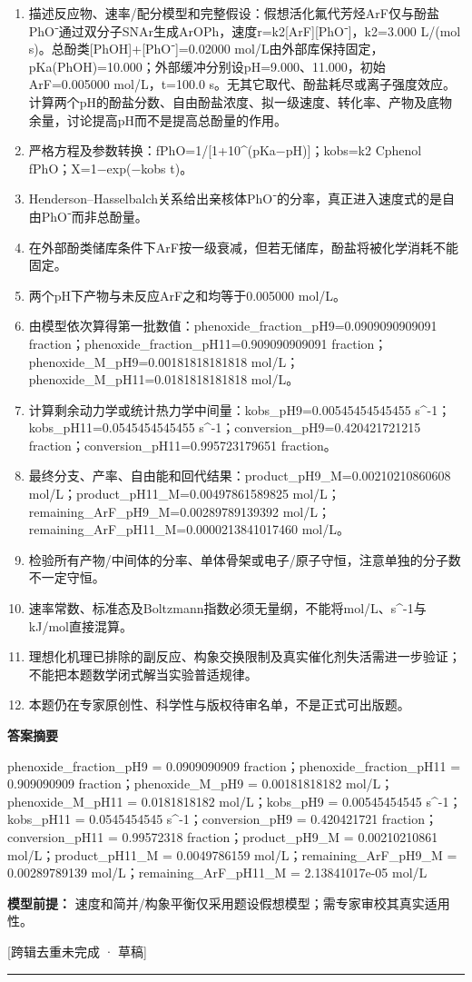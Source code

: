 \documentclass[UTF8,11pt,a4paper]{ctexart}
\begin{document}
\begin{enumerate}
\item 描述反应物、速率/配分模型和完整假设：假想活化氟代芳烃ArF仅与酚盐PhO⁻通过双分子SNAr生成ArOPh，速度r=k2[ArF][PhO⁻]，k2=3.000 L/(mol s)。总酚类[PhOH]+[PhO⁻]=0.02000 mol/L由外部库保持固定，pKa(PhOH)=10.000；外部缓冲分别设pH=9.000、11.000，初始ArF=0.005000 mol/L，t=100.0 s。无其它取代、酚盐耗尽或离子强度效应。计算两个pH的酚盐分数、自由酚盐浓度、拟一级速度、转化率、产物及底物余量，讨论提高pH而不是提高总酚量的作用。
\item 严格方程及参数转换：fPhO=1/[1+10\textasciicircum{}(pKa−pH)]；kobs=k2 Cphenol fPhO；X=1−exp(−kobs t)。
\item Henderson–Hasselbalch关系给出亲核体PhO⁻的分率，真正进入速度式的是自由PhO⁻而非总酚量。
\item 在外部酚类储库条件下ArF按一级衰减，但若无储库，酚盐将被化学消耗不能固定。
\item 两个pH下产物与未反应ArF之和均等于0.005000 mol/L。
\item 由模型依次算得第一批数值：phenoxide\_fraction\_pH9=0.0909090909091 fraction；phenoxide\_fraction\_pH11=0.909090909091 fraction；phenoxide\_M\_pH9=0.00181818181818 mol/L；phenoxide\_M\_pH11=0.0181818181818 mol/L。
\item 计算剩余动力学或统计热力学中间量：kobs\_pH9=0.00545454545455 s\textasciicircum{}-1；kobs\_pH11=0.0545454545455 s\textasciicircum{}-1；conversion\_pH9=0.420421721215 fraction；conversion\_pH11=0.995723179651 fraction。
\item 最终分支、产率、自由能和回代结果：product\_pH9\_M=0.00210210860608 mol/L；product\_pH11\_M=0.00497861589825 mol/L；remaining\_ArF\_pH9\_M=0.00289789139392 mol/L；remaining\_ArF\_pH11\_M=0.0000213841017460 mol/L。
\item 检验所有产物/中间体的分率、单体骨架或电子/原子守恒，注意单独的分子数不一定守恒。
\item 速率常数、标准态及Boltzmann指数必须无量纲，不能将mol/L、s\textasciicircum{}-1与kJ/mol直接混算。
\item 理想化机理已排除的副反应、构象交换限制及真实催化剂失活需进一步验证；不能把本题数学闭式解当实验普适规律。
\item 本题仍在专家原创性、科学性与版权待审名单，不是正式可出版题。
\end{enumerate}
\noindent\textbf{答案摘要}\par
phenoxide\_fraction\_pH9 = 0.0909090909 fraction；phenoxide\_fraction\_pH11 = 0.909090909 fraction；phenoxide\_M\_pH9 = 0.00181818182 mol/L；phenoxide\_M\_pH11 = 0.0181818182 mol/L；kobs\_pH9 = 0.00545454545 s\textasciicircum{}-1；kobs\_pH11 = 0.0545454545 s\textasciicircum{}-1；conversion\_pH9 = 0.420421721 fraction；conversion\_pH11 = 0.99572318 fraction；product\_pH9\_M = 0.00210210861 mol/L；product\_pH11\_M = 0.0049786159 mol/L；remaining\_ArF\_pH9\_M = 0.00289789139 mol/L；remaining\_ArF\_pH11\_M = 2.13841017e-05 mol/L\par
\noindent\textbf{模型前提：}
速度和简并/构象平衡仅采用题设假想模型；需专家审校其真实适用性。\par
\noindent\textcolor{red!65!black}{[跨辑去重未完成 · 草稿]} \par
\medskip\hrule\medskip
{}
\end{document}
